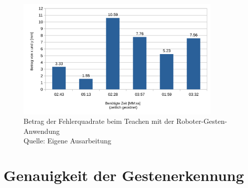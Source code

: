 \begin{figure}[htb]
	\centering
	\includegraphics[width=0.88\textwidth]{images/ergebnisse/Betrag_der_Fehlerquadrate}
	\caption[Betrag der Fehlerquadrate beim Teachen mit der Roboter-Gesten-Anwendung]{Betrag der Fehlerquadrate beim Teachen mit der Roboter-Gesten-Anwendung\\Quelle: Eigene Ausarbeitung}
	\label{fig:measurement_teaching_positions}
\end{figure}
\FloatBarrier

\section{Genauigkeit der Gestenerkennung}


